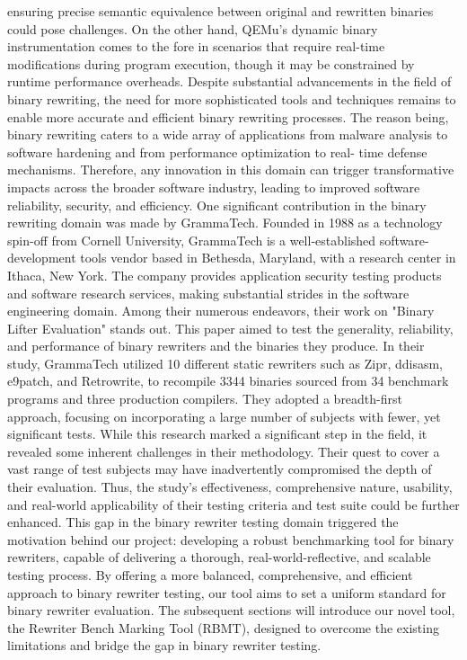 \documentclass[a4paper,11pt,oneside]{report}
\begin{document}
ensuring precise semantic equivalence between original and rewritten binaries could pose
challenges. On the other hand, QEMu's dynamic binary instrumentation comes to the fore in
scenarios that require real-time modifications during program execution, though it may be
constrained by runtime performance overheads.
Despite substantial advancements in the field of binary rewriting, the need for more
sophisticated tools and techniques remains to enable more accurate and efficient binary
rewriting processes. The reason being, binary rewriting caters to a wide array of applications
from malware analysis to software hardening and from performance optimization to real-
time defense mechanisms. Therefore, any innovation in this domain can trigger
transformative impacts across the broader software industry, leading to improved software
reliability, security, and efficiency.
One significant contribution in the binary rewriting domain was made by
GrammaTech. Founded in 1988 as a technology spin-off from Cornell University,
GrammaTech is a well-established software-development tools vendor based in Bethesda,
Maryland, with a research center in Ithaca, New York. The company provides application
security testing products and software research services, making substantial strides in the
software engineering domain. Among their numerous endeavors, their work on "Binary
Lifter Evaluation" stands out. This paper aimed to test the generality, reliability, and
performance of binary rewriters and the binaries they produce.
In their study, GrammaTech utilized 10 different static rewriters such as Zipr,
ddisasm, e9patch, and Retrowrite, to recompile 3344 binaries sourced from 34 benchmark
programs and three production compilers. They adopted a breadth-first approach, focusing
on incorporating a large number of subjects with fewer, yet significant tests. While this
research marked a significant step in the field, it revealed some inherent challenges in their
methodology. Their quest to cover a vast range of test subjects may have inadvertently
compromised the depth of their evaluation. Thus, the study's effectiveness, comprehensive
nature, usability, and real-world applicability of their testing criteria and test suite could be
further enhanced.
This gap in the binary rewriter testing domain triggered the motivation behind our
project: developing a robust benchmarking tool for binary rewriters, capable of delivering a
thorough, real-world-reflective, and scalable testing process. By offering a more balanced,
comprehensive, and efficient approach to binary rewriter testing, our tool aims to set a
uniform standard for binary rewriter evaluation. The subsequent sections will introduce our
novel tool, the Rewriter Bench Marking Tool (RBMT), designed to overcome the existing
limitations and bridge the gap in binary rewriter testing.
\end{document}
